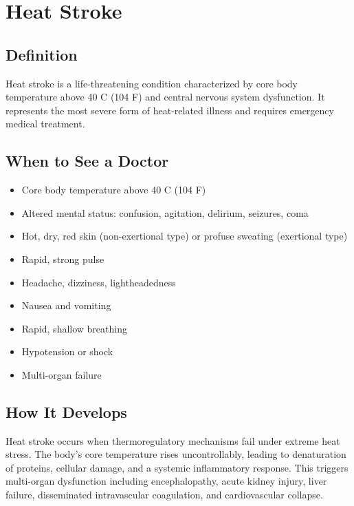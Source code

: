 \chapter{Heat Stroke}

\section*{Definition}
Heat stroke is a life-threatening condition characterized by core body temperature above 40 C (104 F) and central nervous system dysfunction. It represents the most severe form of heat-related illness and requires emergency medical treatment.

\section*{When to See a Doctor}
\begin{itemize}
\item Core body temperature above 40 C (104 F)
\item Altered mental status: confusion, agitation, delirium, seizures, coma
\item Hot, dry, red skin (non-exertional type) or profuse sweating (exertional type)
\item Rapid, strong pulse
\item Headache, dizziness, lightheadedness
\item Nausea and vomiting
\item Rapid, shallow breathing
\item Hypotension or shock
\item Multi-organ failure
\end{itemize}

\section*{How It Develops}
Heat stroke occurs when thermoregulatory mechanisms fail under extreme heat stress. The body's core temperature rises uncontrollably, leading to denaturation of proteins, cellular damage, and a systemic inflammatory response. This triggers multi-organ dysfunction including encephalopathy, acute kidney injury, liver failure, disseminated intravascular coagulation, and cardiovascular collapse.

